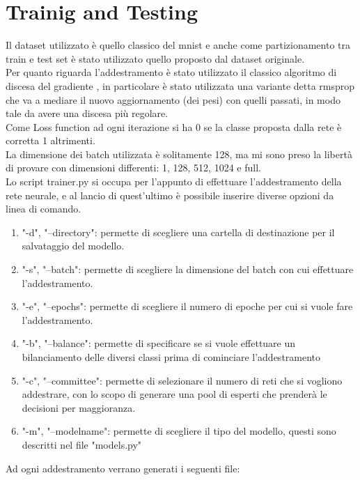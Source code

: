 \documentclass[12pt]{article}
\begin{document}
\section{Trainig and Testing}

Il dataset utilizzato è quello classico del mnist e anche come partizionamento
tra train e test set è stato utilizzato quello proposto dal dataset originale.\\
Per quanto riguarda l'addestramento è stato utilizzato il classico algoritmo
di discesa del gradiente \cite{gradient}, in particolare è stato utilizzata una variante detta 
rmsprop\cite{rmsprop} che va a mediare il nuovo aggiornamento (dei pesi) con quelli passati, in modo
tale da avere una discesa più regolare.\\
Come Loss function ad ogni iterazione si ha 0 se la classe proposta dalla rete
è corretta 1 altrimenti.\\
La dimensione dei batch utilizzata è solitamente 128, ma mi sono preso la libertà di
provare con dimensioni differenti: 1, 128, 512, 1024 e full.\\
Lo script trainer.py si occupa per l'appunto di effettuare l'addestramento della
rete neurale, e al lancio di quest'ultimo è possibile inserire diverse opzioni da linea
di comando.

\begin{enumerate}
    \item "-d", "--directory": permette di scegliere una cartella di destinazione
    per il salvataggio del modello.
    \item "-s", "--batch": permette di scegliere la dimensione del batch con cui
    effettuare l'addestramento.
    \item "-e", "--epochs": permette di scegliere il numero di epoche per
    cui si vuole fare l'addestramento.
    \item "-b", "--balance": permette di specificare se si vuole effettuare
    un bilanciamento delle diversi classi prima di cominciare l'addestramento
    \item "-c", "--committee": permette di selezionare il numero di reti che si 
    vogliono addestrare, con lo scopo di generare una pool di esperti che prenderà
    le decisioni per maggioranza.
    \item "-m", "--modelname": permette di scegliere il tipo del modello, questi
    sono descritti nel file "models.py"
\end{enumerate}
Ad ogni addestramento verrano generati i seguenti file:
\end{document}

